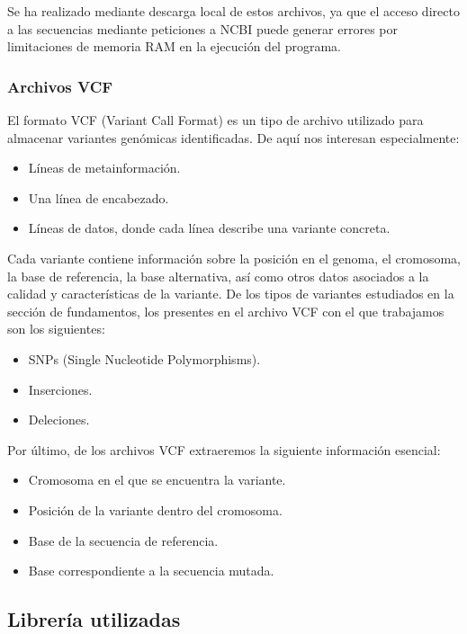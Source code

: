\documentclass[11pt,spanish,listoffigures,listoftables]{tfgetsinf}
\begin{document}
Se ha realizado mediante descarga local de estos archivos, ya que el acceso directo a las secuencias mediante peticiones a NCBI puede generar errores por limitaciones de memoria RAM en la ejecución del programa. 

\subsubsection{Archivos VCF}

El formato VCF (Variant Call Format) es un tipo de archivo utilizado para almacenar variantes genómicas identificadas. De aquí nos interesan especialmente: 

\begin{itemize}
   \item Líneas de metainformación. 
   \item Una línea de encabezado.
   \item Líneas de datos, donde cada línea describe una variante concreta. 
\end{itemize}

Cada variante contiene información sobre la posición en el genoma, el cromosoma, la base de referencia, la base alternativa, así como otros datos asociados a la calidad y características de la variante. De los tipos de variantes estudiados en la sección de fundamentos, los presentes en el archivo VCF con el que trabajamos son los siguientes: 

\begin{itemize}
   \item SNPs (Single Nucleotide Polymorphisms). 
   \item Inserciones. 
   \item Deleciones.
\end{itemize}

Por último, de los archivos VCF extraeremos la siguiente información esencial: 

\begin{itemize}
   \item Cromosoma en el que se encuentra la variante.
   \item Posición de la variante dentro del cromosoma.  
   \item Base de la secuencia de referencia.
   \item Base correspondiente a la secuencia mutada.
\end{itemize}
 

\subsection{Librería utilizadas}
\end{document}
